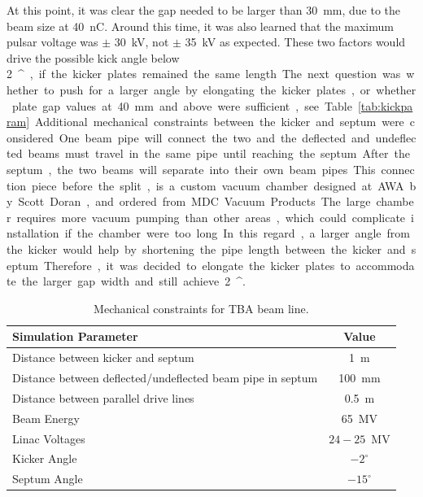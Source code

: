 At this point, it was clear the gap needed to be larger than \SI{30}{mm}, 
due to the beam size at \SI{40}{nC}. Around this time, 
it was also learned that the maximum pulsar voltage was $\pm$ \SI{30}{kV},
not $\pm$ \SI{35}{kV} as expected. 
These two factors would drive the possible kick angle below \SI{2}{^\circ}, 
if the kicker plates remained the same length.
The next question was whether to push for a larger angle by elongating the kicker plates, 
or whether plate gap values at \SI{40}{mm} and above were sufficient, see Table~\ref{tab:kickparam}.
Additional mechanical constraints between the kicker and septum were considered. 
One beam pipe will connect the two and the deflected and undeflected 
beams must travel in the same pipe until reaching the septum.
After the septum, the two beams will separate into their own beam pipes.
This connection piece before the split, is a custom vacuum chamber designed at 
AWA by Scott Doran, and ordered from MDC Vacuum Products. 
The large chamber requires more vacuum pumping than other areas, 
which could complicate installation if the chamber were too long. 
In this regard, a larger angle from the kicker would help by shortening the pipe length between the kicker and septum.
Therefore, it was decided to elongate the kicker plates to accommodate the larger gap width and still achieve \SI{2}{^\circ}.
 \begin{table}%
	\begin{center}
		\caption{Mechanical constraints for TBA beam line.}
		\label{tab:mechanical}
		\begin{tabular}{lc}
			\toprule
			\toprule
			\textbf{Simulation Parameter} 	&  \textbf{Value} \\ 
			\midrule
			Distance between kicker and septum	&  \SI{1}{m} \\
			Distance between deflected/undeflected beam pipe in septum	& \SI{100}{mm} \\
			Distance between parallel drive lines	& \SI{0.5}{m} \\
			Beam Energy 				& \SI{65}{MV}\\ 
			Linac Voltages 				& $24-25$\SI{}{MV} \\
			Kicker Angle				& $-2^\circ$ \\
			Septum Angle				& $-15^\circ$\\ 
			\bottomrule
		\end{tabular}
	\end{center}
\end{table}

